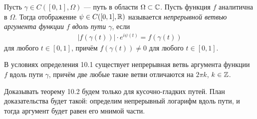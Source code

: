 \documentclass[../complex-analysis.tex]{subfiles}
\begin{document}
\begin{df}
 Пусть $ \gamma \in C([0, 1], \Omega) $ --- путь в области $ \Omega \subset \mathbb{C} $. Пусть функция $ f $ аналитична в $ \Omega $. Тогда отображение $ \psi \in C([0,1], \mathbb{R}) $ называется \textit{непрерывной ветвью аргумента функции $ f $ вдоль пути $ \gamma $}, если
 \begin{align*}
  \left| f(\gamma(t)) \right| \cdot e^{i\psi(t)} = f(\gamma(t))
 \end{align*}
 для любого $ t \in [0,1] $, причём $ f(\gamma(t)) \neq 0 $ для любого $ t \in [0, 1] $.
\end{df}
\begin{thm}
 В условиях определения 10.1 существует непрерывная ветвь аргумента функции $ f $ вдоль пути $ \gamma $, причём две любые такие ветви отличаются на $ 2\pi k $, $ k \in \mathbb{Z} $.
\end{thm}
Доказывать теорему 10.2 будем только для кусочно-гладких путей. План доказательства будет такой: определим непрерывный логарифм вдоль пути, и тогда аргумент будет равен его мнимой части.
\end{document}
